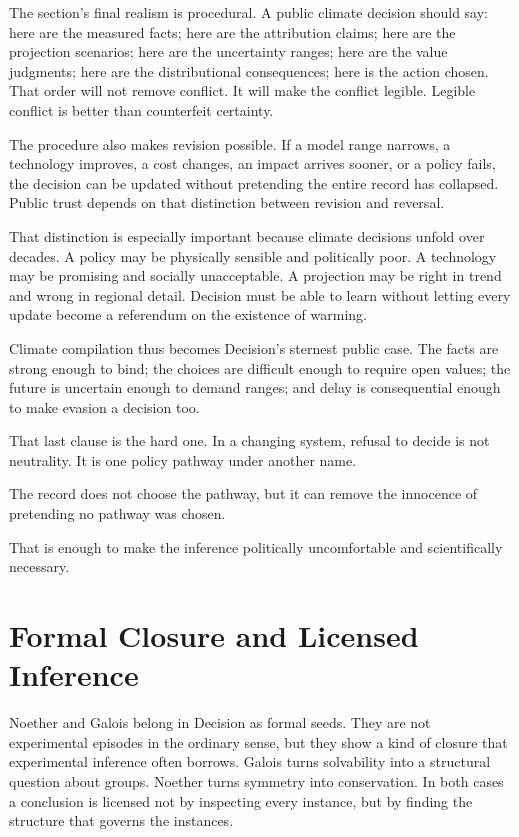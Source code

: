 The section's final realism is procedural. A public climate decision should
say: here are the measured facts; here are the attribution claims; here are
the projection scenarios; here are the uncertainty ranges; here are the value
judgments; here are the distributional consequences; here is the action
chosen. That order will not remove conflict. It will make the conflict
legible. Legible conflict is better than counterfeit certainty.

The procedure also makes revision possible. If a model range narrows, a
technology improves, a cost changes, an impact arrives sooner, or a policy
fails, the decision can be updated without pretending the entire record has
collapsed. Public trust depends on that distinction between revision and
reversal.

That distinction is especially important because climate decisions unfold
over decades. A policy may be physically sensible and politically poor. A
technology may be promising and socially unacceptable. A projection may be
right in trend and wrong in regional detail. Decision must be able to learn
without letting every update become a referendum on the existence of warming.

Climate compilation thus becomes Decision's sternest public case. The
facts are strong enough to bind; the choices are difficult enough to require
open values; the future is uncertain enough to demand ranges; and delay is
consequential enough to make evasion a decision too.

That last clause is the hard one. In a changing system, refusal to decide is
not neutrality. It is one policy pathway under another name.

The record does not choose the pathway, but it can remove the innocence of
pretending no pathway was chosen.

That is enough to make the inference politically uncomfortable and
scientifically necessary.

\section{Formal Closure and Licensed Inference}

Noether and Galois belong in Decision as formal seeds. They are not
experimental episodes in the ordinary sense, but they show a kind of closure
that experimental inference often borrows. Galois turns solvability into a
structural question about groups. Noether turns symmetry into conservation.
In both cases a conclusion is licensed not by inspecting every instance, but
by finding the structure that governs the instances.

